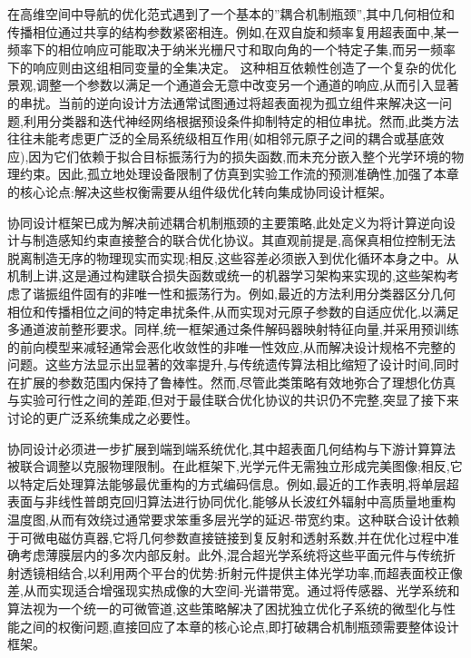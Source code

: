 在高维空间中导航的优化范式遇到了一个基本的''耦合机制瓶颈'',其中几何相位和传播相位通过共享的结构参数紧密相连。例如,在双自旋和频率复用超表面中,某一频率下的相位响应可能取决于纳米光栅尺寸和取向角的一个特定子集,而另一频率下的响应则由这组相同变量的全集决定。\citep{doi_10_1117_1_apn_2_1_016010_57069347} \citep{doi_10_1002_advs_202504634_52bafb6c} 这种相互依赖性创造了一个复杂的优化景观,调整一个参数以满足一个通道会无意中改变另一个通道的响应,从而引入显著的串扰。当前的逆向设计方法通常试图通过将超表面视为孤立组件来解决这一问题,利用分类器和迭代神经网络根据预设条件抑制特定的相位串扰。然而,此类方法往往未能考虑更广泛的全局系统级相互作用(如相邻元原子之间的耦合或基底效应),因为它们依赖于拟合目标振荡行为的损失函数,而未充分嵌入整个光学环境的物理约束。因此,孤立地处理设备限制了仿真到实验工作流的预测准确性,加强了本章的核心论点:解决这些权衡需要从组件级优化转向集成协同设计框架。\citep{doi_10_1117_1_apn_2_1_016010_57069347} \citep{doi_10_1515_nanoph_2020_0379_1cc596ab}

协同设计框架已成为解决前述耦合机制瓶颈的主要策略,此处定义为将计算逆向设计与制造感知约束直接整合的联合优化协议。其直观前提是,高保真相位控制无法脱离制造无序的物理现实而实现;相反,这些容差必须嵌入到优化循环本身之中。从机制上讲,这是通过构建联合损失函数或统一的机器学习架构来实现的,这些架构考虑了谐振组件固有的非唯一性和振荡行为。例如,最近的方法利用分类器区分几何相位和传播相位之间的特定串扰条件,从而实现对元原子参数的自适应优化,以满足多通道波前整形要求。同样,统一框架通过条件解码器映射特征向量,并采用预训练的前向模型来减轻通常会恶化收敛性的非唯一性效应,从而解决设计规格不完整的问题。这些方法显示出显著的效率提升,与传统遗传算法相比缩短了设计时间,同时在扩展的参数范围内保持了鲁棒性。然而,尽管此类策略有效地弥合了理想化仿真与实验可行性之间的差距,但对于最佳联合优化协议的共识仍不完整,突显了接下来讨论的更广泛系统集成之必要性。\citep{doi_10_1117_1_apn_2_1_016010_57069347} \citep{doi_10_1515_nanoph_2020_0379_1cc596ab} \citep{doi_10_23919_piers_fall62445_2025_11394631_4fdb8517}

协同设计必须进一步扩展到端到端系统优化,其中超表面几何结构与下游计算算法被联合调整以克服物理限制。在此框架下,光学元件无需独立形成完美图像;相反,它以特定后处理算法能够最优重构的方式编码信息。例如,最近的工作表明,将单层超表面与非线性普朗克回归算法进行协同优化,能够从长波红外辐射中高质量地重构温度图,从而有效绕过通常要求笨重多层光学的延迟-带宽约束。这种联合设计依赖于可微电磁仿真器,它将几何参数直接链接到复反射和透射系数,并在优化过程中准确考虑薄膜层内的多次内部反射。此外,混合超光学系统将这些平面元件与传统折射透镜相结合,以利用两个平台的优势:折射元件提供主体光学功率,而超表面校正像差,从而实现适合增强现实热成像的大空间-光谱带宽。通过将传感器、光学系统和算法视为一个统一的可微管道,这些策略解决了困扰独立优化子系统的微型化与性能之间的权衡问题,直接回应了本章的核心论点,即打破耦合机制瓶颈需要整体设计框架。\citep{doi_10_1002_adom_202402498_4083d234} \citep{doi_10_1002_lpor_71431_d57da40c}

